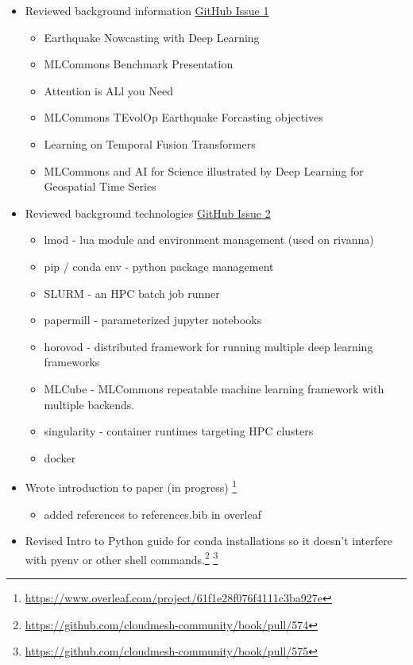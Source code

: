 \documentclass[sigplan,screen]{acmart}
\providecommand{\mlcube}{MLCube}
\newcommand{\GITISSUE}[1]{\href{https://github.com/Data-ScienceHub/mlcommons-science/issues/#1}{GitHub Issue #1}}
\begin{document}
\begin{itemize}
\item Reviewed background information \GITISSUE{1}
    \begin{itemize}
    \item Earthquake Nowcasting with Deep Learning
    \item MLCommons Benchmark Presentation
    \item Attention is ALl you Need
    \item MLCommons TEvolOp Earthquake Forcasting objectives
    \item Learning on Temporal Fusion Transformers
    \item MLCommons and AI for Science illustrated by Deep Learning for Geospatial Time Series
    \end{itemize}
\item Reviewed background technologies \GITISSUE{2}
    \begin{itemize}
    \item lmod - lua module and environment management (used on rivanna)
    \item pip / conda env - python package management
    \item SLURM - an HPC batch job runner
    \item papermill - parameterized jupyter notebooks
    \item horovod - distributed framework for running multiple deep learning frameworks
    \item \mlcube{} - MLCommons repeatable machine learning framework with multiple backends.
    \item singularity - container runtimes targeting HPC clusters
    \item docker
\end{itemize}
\item Wrote introduction to paper (in progress) \footnote{\url{https://www.overleaf.com/project/61f1e28f076f4111c3ba927e}}
    \begin{itemize}
    \item added references to references.bib in overleaf
    \end{itemize}

  \item Revised Intro to Python guide for conda installations so it
    doesn't interfere with pyenv or other shell
    commands.\footnote{\url{https://github.com/cloudmesh-community/book/pull/574}} \footnote{\url{https://github.com/cloudmesh-community/book/pull/575}}


\end{itemize}
\end{document}
